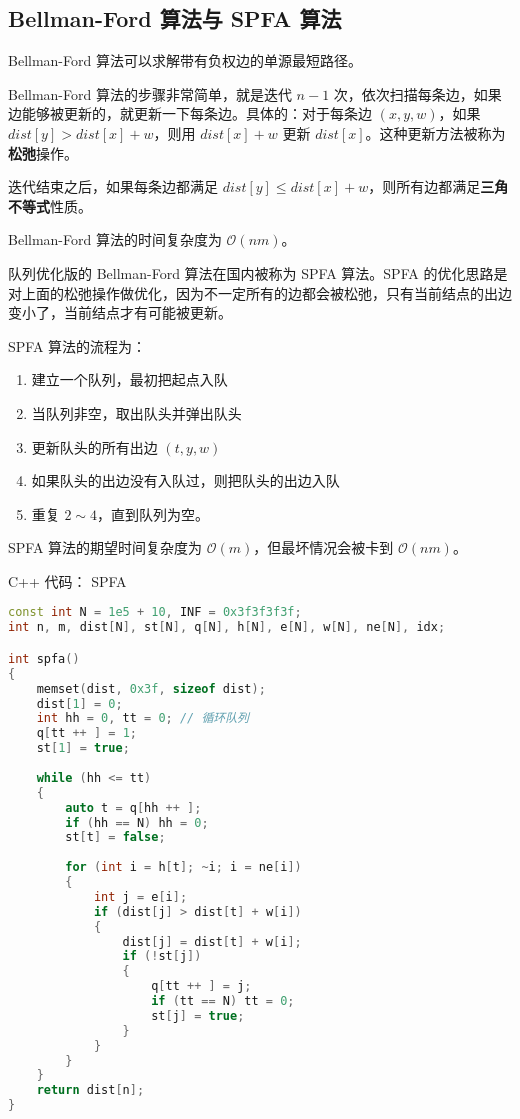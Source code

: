 \subsection{Bellman-Ford 算法与 SPFA 算法}

Bellman-Ford 算法可以求解带有负权边的单源最短路径。

Bellman-Ford 算法的步骤非常简单，就是迭代 $n - 1$ 次，依次扫描每条边，如果边能够被更新的，就更新一下每条边。具体的：对于每条边 $(x, y, w)$，如果 $dist[y] > dist[x] + w$，则用 $dist[x] + w$ 更新 $dist[x]$。这种更新方法被称为\textbf{松弛}操作。

迭代结束之后，如果每条边都满足 $dist[y] \leq dist[x] + w$，则所有边都满足\textbf{三角不等式}性质。

Bellman-Ford 算法的时间复杂度为 $\mathcal{O}(nm)$。

队列优化版的 Bellman-Ford 算法在国内被称为 SPFA 算法。SPFA 的优化思路是对上面的松弛操作做优化，因为不一定所有的边都会被松弛，只有当前结点的出边变小了，当前结点才有可能被更新。

SPFA 算法的流程为：

\begin{enumerate}
\item 建立一个队列，最初把起点入队
\item 当队列非空，取出队头并弹出队头
\item 更新队头的所有出边 $(t, y, w)$
\item 如果队头的出边没有入队过，则把队头的出边入队
\item 重复 $2 \sim 4$，直到队列为空。
\end{enumerate}

SPFA 算法的期望时间复杂度为 $\mathcal{O}(m)$，但最坏情况会被卡到 $\mathcal{O}(nm)$。

C++ 代码：
SPFA

\begin{lstlisting}[language=cpp]
const int N = 1e5 + 10, INF = 0x3f3f3f3f;
int n, m, dist[N], st[N], q[N], h[N], e[N], w[N], ne[N], idx;

int spfa()
{
    memset(dist, 0x3f, sizeof dist);
    dist[1] = 0;
    int hh = 0, tt = 0; // 循环队列
    q[tt ++ ] = 1;
    st[1] = true;
    
    while (hh <= tt)
    {
        auto t = q[hh ++ ];
        if (hh == N) hh = 0;
        st[t] = false;
        
        for (int i = h[t]; ~i; i = ne[i])
        {
            int j = e[i];
            if (dist[j] > dist[t] + w[i])
            {
                dist[j] = dist[t] + w[i];
                if (!st[j])
                {
                    q[tt ++ ] = j;
                    if (tt == N) tt = 0;
                    st[j] = true;
                }
            }
        }
    }
    return dist[n];
}
\end{lstlisting}

